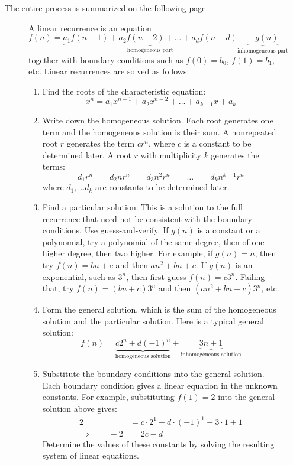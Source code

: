 The entire process is summarized on the following page.

\begin{figure}[p]\redrawntrue

\begin{pagesidebar}[to \textheight]

A linear recurrence is an equation
\begin{equation*}
f(n) = \underbrace{a_1 f(n-1) + a_2 f(n-2) + \ldots + a_d f(n -
  d)}_{\text{homogeneous part}}
\underbrace{+\ g(n)}_{\text{inhomogeneous part}}
\end{equation*}
together with boundary conditions such as $f(0) = b_0$, $f(1) = b_1$,
etc.  Linear recurrences are solved as follows:

\begin{enumerate}
\item Find the roots of the characteristic equation:
\begin{equation*}
x^n = a_1 x^{n-1} + a_2 x^{n-2} + \ldots + a_{k-1} x + a_k
\end{equation*}
\item Write down the homogeneous solution.  Each root generates one
  term and the homogeneous solution is their sum.  A nonrepeated root
  $r$ generates the term $c r^n$, where $c$ is a constant to be
  determined later.  A root $r$ with multiplicity $k$ generates the
  terms:
\[
d_{1} r^n \qquad d_2 n r^n \qquad d_3 n^2 r^n \qquad \ldots \qquad d_k n^{k-1} r^n
\]
where $d_1, \ldots d_k$ are constants to be determined later.
\item Find a particular solution.  This is a solution to the full
  recurrence that need not be consistent with the boundary conditions.
  Use guess-and-verify.  If $g(n)$ is a constant or a polynomial, try
  a polynomial of the same degree, then of one higher degree, then two
  higher.  For example, if $g(n) = n$, then try $f(n) = bn + c$ and
  then $an^2 + bn + c$.  If $g(n)$ is an exponential, such as $3^n$,
  then first guess $f(n) = c3^n$.  Failing that, try $f(n) = (bn + c) 3^n$
  and then $(an^2 + bn + c)3^n$, etc.
\item Form the general solution, which is the sum of the homogeneous
  solution and the particular solution.  Here is a typical general
  solution:
\begin{equation*}
f(n) = \underbrace{c2^n + d(-1)^n}_{\text{homogeneous solution}} +
\underbrace{3n + 1}_{\text{inhomogeneous solution}}
\end{equation*}
\item Substitute the boundary conditions into the general solution.
  Each boundary condition gives a linear equation in the unknown
  constants.  For example, substituting $f(1) = 2$ into the general
  solution above gives:
\begin{align*}
2 & = c\cdot2^1 + d \cdot(-1)^1 + 3 \cdot 1 + 1 \\
\Rightarrow \qquad -2 & = 2c - d
\end{align*}
Determine the values of these constants by solving the resulting
system of linear equations.
\end{enumerate}
\end{pagesidebar}


\end{figure}
